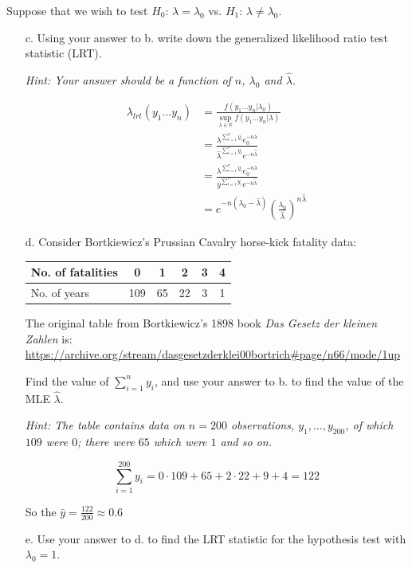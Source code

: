 \documentclass{article}
\newcommand{\field}[1]{\mathbb{#1}}
\newcommand{\1}{\mathbf{1}}
\newcommand{\R}{\field{R}} %
\begin{document}
Suppose that we wish to test $H_0$: $\lambda =\lambda_0$ vs. $H_1$: $\lambda \neq \lambda_0$.
\begin{itemize}
    \item[c.] Using your answer to b. write down the generalized likelihood ratio test statistic (LRT).\par
    {\it Hint: Your answer should be a function of $n$, $\lambda_0$ and $\hat{\lambda}$.}
    
    \begin{align*}
        \lambda_{lrt}(y_1\hdots y_n) &= \frac{f(y_1\hdots y_n|\lambda_0)}{\sup_{\lambda\in\R} f(y_1\hdots y_n|\lambda)} \\
        &= \frac{\lambda^{\sum_{i=1}^n y_i} e^{-n\lambda}_0}{\hat\lambda^{\sum_{i=1}^n y_i} e^{-n\hat\lambda}} \\
        &= \frac{\lambda^{\sum_{i=1}^n y_i} e^{-n\lambda}_0}{\bar y^{\sum_{i=1}^n y_i} e^{-n\hat\lambda}} \\
        &= e^{-n(\lambda_0 - \hat\lambda)} \left(\frac{\lambda_0}{\hat\lambda}\right)^{n\hat\lambda}
    \end{align*}
    
    \item[d.] Consider Bortkiewicz's Prussian Cavalry horse-kick fatality data:
    
        \begin{tabular}{l|ccccc}
        No. of fatalities & 0 & 1 & 2 & 3 & 4\\
        \hline
        No. of years & 109 & 65 & 22 & 3 & 1
        \end{tabular}
    \smallskip
    {\scriptsize The original table from Bortkiewicz's 1898 book {\it Das Gesetz der kleinen Zahlen} is: \url{https://archive.org/stream/dasgesetzderklei00bortrich#page/n66/mode/1up}}
    \smallskip
    
    Find the value of $\sum_{i=1}^{n} y_i$, and use your answer to b. to find the value of the MLE $\hat{\lambda}$.\par
    {\it Hint: The table contains data on $n=200$ observations, $y_1,\ldots ,y_{200}$, of which $109$ were $0$; there were $65$ which were $1$ and so on.}

    $$\sum_{i=1}^{200} y_i = 0\cdot 109 + 65 + 2\cdot 22 + 9 + 4 = 122$$

    So the $\bar y = \frac{122}{200} \approx 0.6$
    
    \item[e.] Use your answer to d. to find the LRT statistic for the hypothesis test with $\lambda_0=1$.\par
    

\end{itemize}
\end{document}
